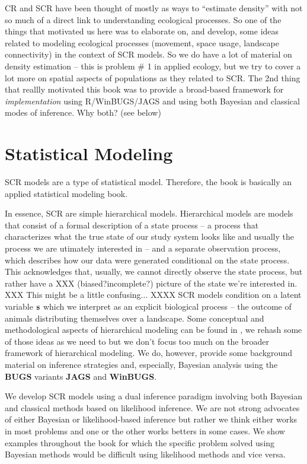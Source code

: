 CR and SCR have been thought of mostly as ways to ``estimate density''
with not so much of a direct link to understanding ecological
processes. So one of the things that motivated us here was to
elaborate on, and develop, some ideas related to modeling ecological
processes (movement, space usage, landscape connectivity) in the
context of SCR models. 
So we do have a lot of material on density estimation -- this is
problem \# 1 in applied ecology, but we try to cover a lot more on
spatial aspects of populations as they related to SCR.
The 2nd thing that reallly motivated this book was to provide a
broad-based framework for {\it implementation} using R/WinBUGS/JAGS and
using both Bayesian and classical modes of inference. 
Why both? (see below) 

\section*{Statistical Modeling}

SCR models are a type of statistical model. Therefore, 
the book is basically an applied statistical modeling book.

In essence, SCR
are simple hierarchical models. 
Hierarchical models are models that consist of a formal description of a state process -- a process that characterizes what the true state of our study system looks like and usually the process we are utimately interested in -- and a separate observation process, which describes how our data were generated conditional on the state process. This acknowledges that, usually, we cannot directly observe the state process, but rather have a XXX (biased?incomplete?) picture of the state we're interested in. XXX This might be a little confusing... XXXX
SCR models condition on a latent variable ${\bf s}$ which we interpret
as an explicit biological process -- the outcome of animals
distributing themselves over a landscape.  Some conceptual and
methodological aspects of hierarchical modeling can be found in
\citet{royle_dorazio:2008}, we rehash some of those ideas as we need
to but we don't focus too much on the broader framework of
hierarchical modeling.
We do, however, 
 provide some background material on inference strategies and,
 especially, Bayesian analysis using the  {\bf BUGS} variants {\bf
   JAGS} and {\bf WinBUGS}. 

We develop SCR models using a dual inference paradigm involving both
Bayesian and classical methods based on likelihood inference.
We are not strong advocates of either Bayesian or likelihood-based
inference but rather we think either works in most problems and one or
the other works betters in some cases. 
We show examples throughout the
book for which the specific problem solved using Bayesian methods
would be difficult using likelihood methods and vice versa.


